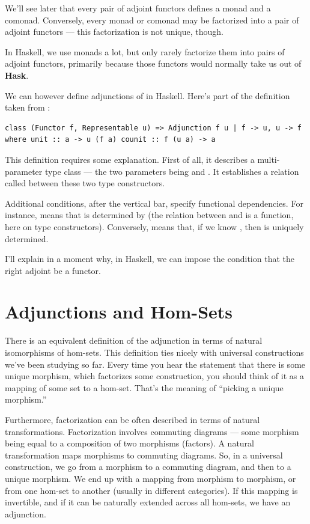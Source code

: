 We'll see later that every pair of adjoint functors defines a monad and
a comonad. Conversely, every monad or comonad may be factorized into a
pair of adjoint functors --- this factorization is not unique, though.

In Haskell, we use monads a lot, but only rarely factorize them into
pairs of adjoint functors, primarily because those functors would
normally take us out of \textbf{Hask}.

We can however define adjunctions of  in Haskell.
Here's part of the definition taken from
:

\begin{verbatim}
class (Functor f, Representable u) => Adjunction f u | f -> u, u -> f where unit :: a -> u (f a) counit :: f (u a) -> a 
\end{verbatim}

This definition requires some explanation. First of all, it describes a
multi-parameter type class --- the two parameters being  and
. It establishes a relation called  between
these two type constructors.

Additional conditions, after the vertical bar, specify functional
dependencies. For instance,  means that
 is determined by  (the relation between 
and  is a function, here on type constructors). Conversely,
 means that, if we know , then
 is uniquely determined.

I'll explain in a moment why, in Haskell, we can impose the condition
that the right adjoint  be a  functor.

\section{Adjunctions and Hom-Sets}\label{adjunctions-and-hom-sets}

There is an equivalent definition of the adjunction in terms of natural
isomorphisms of hom-sets. This definition ties nicely with universal
constructions we've been studying so far. Every time you hear the
statement that there is some unique morphism, which factorizes some
construction, you should think of it as a mapping of some set to a
hom-set. That's the meaning of ``picking a unique morphism.''

Furthermore, factorization can be often described in terms of natural
transformations. Factorization involves commuting diagrams --- some
morphism being equal to a composition of two morphisms (factors). A
natural transformation maps morphisms to commuting diagrams. So, in a
universal construction, we go from a morphism to a commuting diagram,
and then to a unique morphism. We end up with a mapping from morphism to
morphism, or from one hom-set to another (usually in different
categories). If this mapping is invertible, and if it can be naturally
extended across all hom-sets, we have an adjunction.


